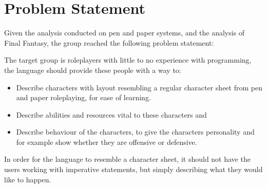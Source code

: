 \newpage
\section{Problem Statement}
Given the analysis conducted on pen and paper systems, and the analysis of Final Fantasy, the group reached the following problem statement:

The target group is roleplayers with little to no experience with programming, the language should provide these people with a way to:
\begin{itemize}
\item Describe characters with layout resembling a regular character sheet from pen and paper roleplaying, for ease of learning.
\item Describe abilities and resources vital to these characters and
\item Describe behaviour of the characters, to give the characters personality and for example show whether they are offensive or defensive.
\end{itemize}

In order for the language to resemble a character sheet, it should not have the users working with imperative statements, but simply describing what they would like to happen.